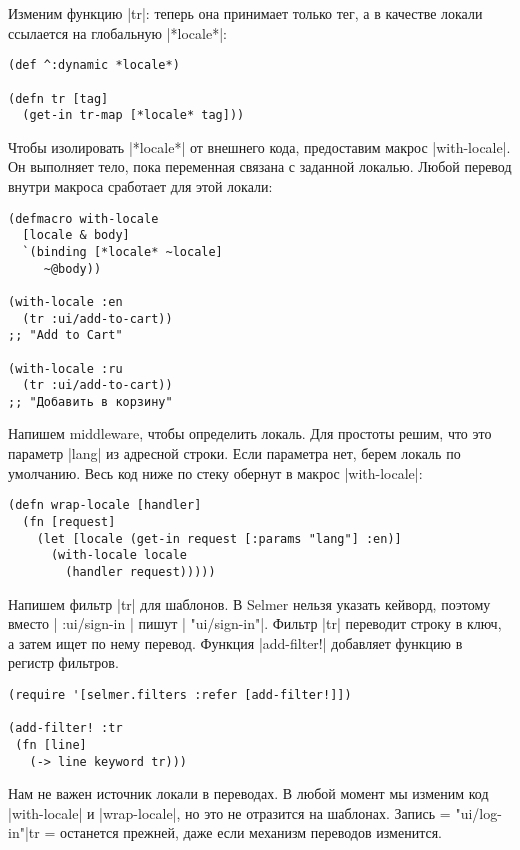 Изменим функцию \spverb|tr|: теперь она принимает только тег, а в качестве
локали ссылается на глобальную \spverb|*locale*|:

\begin{verbatim}
(def ^:dynamic *locale*)

(defn tr [tag]
  (get-in tr-map [*locale* tag]))
\end{verbatim}

Чтобы изолировать \spverb|*locale*| от внешнего кода, предоставим макрос
\spverb|with-locale|. Он выполняет тело, пока переменная связана с заданной
локалью. Любой перевод внутри макроса сработает для этой локали:

\begin{verbatim}
(defmacro with-locale
  [locale & body]
  `(binding [*locale* ~locale]
     ~@body))

(with-locale :en
  (tr :ui/add-to-cart))
;; "Add to Cart"

(with-locale :ru
  (tr :ui/add-to-cart))
;; "Добавить в корзину"
\end{verbatim}

Напишем middleware, чтобы определить локаль. Для простоты решим, что это
параметр \spverb|lang| из адресной строки. Если параметра нет, берем локаль по
умолчанию. Весь код ниже по стеку обернут в макрос \spverb|with-locale|:

\begin{verbatim}
(defn wrap-locale [handler]
  (fn [request]
    (let [locale (get-in request [:params "lang"] :en)]
      (with-locale locale
        (handler request)))))
\end{verbatim}

Напишем фильтр \spverb|tr| для шаблонов. В Selmer нельзя указать кейворд,
поэтому вместо \spverb|{{ :ui/sign-in }}| пишут \spverb|{{ "ui/sign-in"}}|.
Фильтр \spverb|tr| переводит строку в ключ, а затем ищет по нему
перевод. Функция \spverb|add-filter!| добавляет функцию в регистр фильтров.

\begin{verbatim}
(require '[selmer.filters :refer [add-filter!]])

(add-filter! :tr
 (fn [line]
   (-> line keyword tr)))
\end{verbatim}

Нам не важен источник локали в переводах. В любой момент мы изменим код
\spverb|with-locale| и \spverb|wrap-locale|, но это не отразится на
шаблонах. Запись \spverb={{ "ui/log-in"|tr }}= останется прежней, даже если
механизм переводов изменится.


